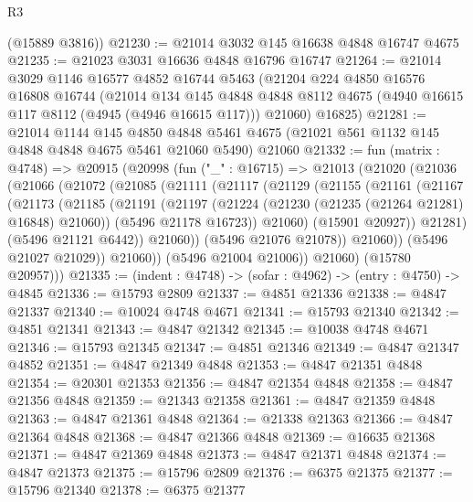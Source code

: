 \begin{lexlean}{R3}
\begin{coremodule}
      (@15889 @3816))
@21230 := @21014 @3032 @145 @16638 @4848 @16747 @4675
@21235 := @21023 @3031 @16636 @4848 @16796 @16747
@21264 := @21014
    @3029
    @1146
    @16577
    @4852
    @16744
    @5463
    (@21204
      @224
      @4850
      @16576
      @16808
      @16744
      (@21014
        @134
        @145
        @4848
        @4848
        @8112
        @4675
        (@4940 @16615 @117 @8112 (@4945 (@4946 @16615 @117)))
        @21060)
      @16825)
@21281 := @21014
    @1144
    @145
    @4850
    @4848
    @5461
    @4675
    (@21021 @561 @1132 @145 @4848 @4848 @4675 @5461 @21060 @5490)
    @21060
@21332 := fun (matrix : @4748) =>
  @20915
    (@20998
      (fun ("_" : @16715) =>
      @21013
        (@21020
          (@21036
            (@21066
              (@21072
                (@21085
                  (@21111
                    (@21117
                      (@21129
                        (@21155
                          (@21161
                            (@21167
                              (@21173
                                (@21185
                                  (@21191
                                    (@21197
                                      (@21224 (@21230 (@21235 (@21264 @21281) @16848) @21060))
                                      (@5496 @21178 @16723))
                                    @21060)
                                  (@15901 @20927))
                                @21281)
                              (@5496 @21121 @6442))
                            @21060))
                        (@5496 @21076 @21078))
                      @21060))
                  (@5496 @21027 @21029))
                @21060))
            (@5496 @21004 @21006))
          @21060)
        (@15780 @20957)))
@21335 := (indent : @4748) -> (sofar : @4962) -> (entry : @4750) -> @4845
@21336 := @15793 @2809
@21337 := @4851 @21336
@21338 := @4847 @21337
@21340 := @10024 @4748 @4671
@21341 := @15793 @21340
@21342 := @4851 @21341
@21343 := @4847 @21342
@21345 := @10038 @4748 @4671
@21346 := @15793 @21345
@21347 := @4851 @21346
@21349 := @4847 @21347 @4852
@21351 := @4847 @21349 @4848
@21353 := @4847 @21351 @4848
@21354 := @20301 @21353
@21356 := @4847 @21354 @4848
@21358 := @4847 @21356 @4848
@21359 := @21343 @21358
@21361 := @4847 @21359 @4848
@21363 := @4847 @21361 @4848
@21364 := @21338 @21363
@21366 := @4847 @21364 @4848
@21368 := @4847 @21366 @4848
@21369 := @16635 @21368
@21371 := @4847 @21369 @4848
@21373 := @4847 @21371 @4848
@21374 := @4847 @21373
@21375 := @15796 @2809
@21376 := @6375 @21375
@21377 := @15796 @21340
@21378 := @6375 @21377

\end{coremodule}
\end{lexlean}
